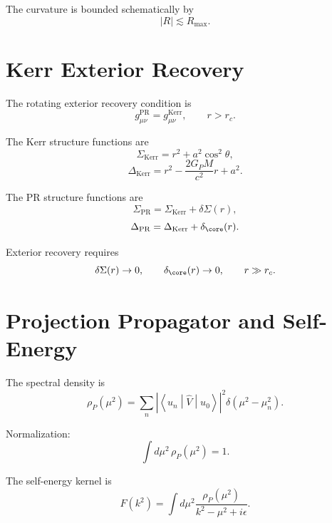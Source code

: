 \documentclass[11pt]{article}
\newcommand{\PR}{\mathrm{PR}}
\newcommand{\Kerr}{\mathrm{Kerr}}
\begin{document}
The curvature is bounded schematically by
\begin{equation}
|R|\lesssim R_{\max}.
\end{equation}


\section{Kerr Exterior Recovery}

The rotating exterior recovery condition is
\begin{equation}
\boxed{
g_{\mu\nu}^{\PR}
=
g_{\mu\nu}^{\Kerr},
\qquad
r>r_c.
}
\end{equation}

The Kerr structure functions are
\begin{equation}
\Sigma_{\Kerr}
=
r^2+a^2\cos^2\theta,
\end{equation}
\begin{equation}
\Delta_{\Kerr}
=
r^2-\frac{2G_PM}{c^2}r+a^2.
\end{equation}

The PR structure functions are
\begin{equation}
\Sigma_{\PR}
=
\Sigma_{\Kerr}+\delta\Sigma(r),
\end{equation}
\begin{equation}
\Delta_{\PR}
=
\Delta_{\Kerr}+\delta_{\core}(r).
\end{equation}

Exterior recovery requires
\begin{equation}
\delta\Sigma(r)\rightarrow0,
\qquad
\delta_{\core}(r)\rightarrow0,
\qquad
r\gg r_c.
\end{equation}


\section{Projection Propagator and Self-Energy}

The spectral density is
\begin{equation}
\boxed{
\rho_P(\mu^2)
=
\sum_n
\left|
\left\langle
u_n
\middle|
\hat V
\middle|
u_0
\right\rangle
\right|^2
\delta(\mu^2-\mu_n^2).
}
\end{equation}

Normalization:
\begin{equation}
\boxed{
\int d\mu^2\,\rho_P(\mu^2)=1.
}
\end{equation}

The self-energy kernel is
\begin{equation}
\boxed{
F(k^2)
=
\int d\mu^2
\frac{\rho_P(\mu^2)}
{k^2-\mu^2+i\epsilon}.
}
\end{equation}
\end{document}
